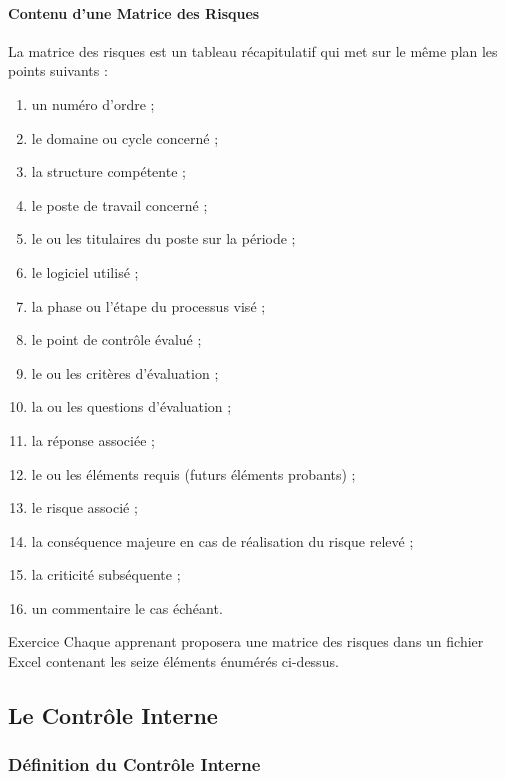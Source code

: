 \paragraph{Contenu d'une Matrice des Risques}
La matrice des risques est un tableau récapitulatif qui met sur le même plan les points
suivants :
\begin{enumerate}
  \item un numéro d'ordre ;
  \item le domaine ou cycle concerné ;
  \item la structure compétente ;
  \item le poste de travail concerné ;
  \item le ou les titulaires du poste sur la période ;
  \item le logiciel utilisé ;
  \item la phase ou l'étape du processus visé ;
  \item le point de contrôle évalué ;
  \item le ou les critères d'évaluation ;
  \item la ou les questions d'évaluation ;
  \item la réponse associée ;
  \item le ou les éléments requis (futurs éléments probants) ;
  \item le risque associé ;
  \item la conséquence majeure en cas de réalisation du risque relevé ;
  \item la criticité subséquente ;
  \item un commentaire le cas échéant.
\end{enumerate}

\begin{boxexo}{Exercice}
Chaque apprenant proposera une matrice des risques dans un fichier Excel contenant
les seize éléments énumérés ci-dessus.
\end{boxexo}

\subsection{Le Contrôle Interne}

\subsubsection{Définition du Contrôle Interne}

